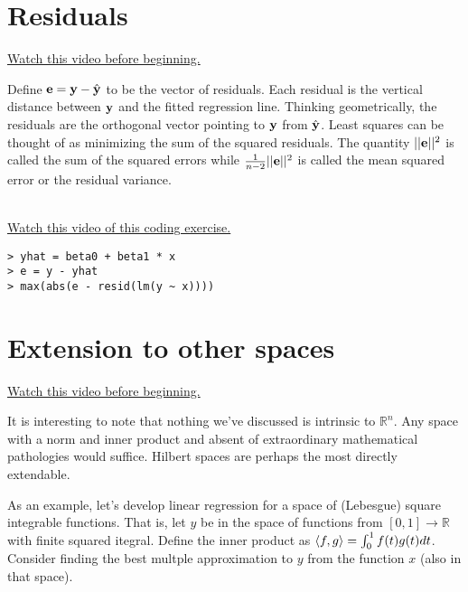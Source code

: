 \section{Residuals}
\href{https://www.youtube.com/watch?v=F5yP2GxXeaI&index=18&list=PLpl-gQkQivXhdgUCdaUQcdb31CRe8Mm2y}{Watch this video before beginning.}

Define $\mathbf{e} = \mathbf{y} - \hat {\mathbf{y}}$ to be the vector of residuals. Each residual
is the vertical distance between $\mathbf{y}$ and the fitted regression line. 
Thinking geometrically, the residuals are the orthogonal vector pointing
to $\mathbf{y}$ from $\hat {\mathbf{y}}$. Least squares can be thought of as minimizing
the sum of the squared residuals. The quantity
$||\mathbf{e}||^2 $
is called the sum of the squared errors while $\frac{1}{n-2}||\mathbf{e}||^2$ is
called the mean squared error or the residual variance.

~\\
\noindent
\href{https://www.youtube.com/watch?v=k8szlEkWmAg&list=PLpl-gQkQivXhdgUCdaUQcdb31CRe8Mm2y&index=19}{Watch this video of this coding exercise.}
\begin{verbatim}
> yhat = beta0 + beta1 * x 
> e = y - yhat
> max(abs(e - resid(lm(y ~ x))))
\end{verbatim}


\section{Extension to other spaces}
\href{https://www.youtube.com/watch?v=ax1M0bgi-6E&list=PLpl-gQkQivXhdgUCdaUQcdb31CRe8Mm2y&index=20}{Watch this video before beginning.}

It is interesting to note that nothing we've discussed is intrinsic
to $\mathbb{R}^n$. Any space with a norm and inner product and
absent of extraordinary mathematical pathologies would suffice.  Hilbert spaces are perhaps the most directly extendable. 

As an example, let's develop linear regression for
a space of (Lebesgue) square integrable functions. That is, let $y$ be in the space
of functions from $[0,1] \rightarrow \mathbb{R}$ with finite squared itegral.
Define the inner product as $\langle f, g \rangle = \int_0^1 f(t)g(t)dt$. Consider
finding the best multple approximation to $y$ from the function $x$ (also in that space). 

